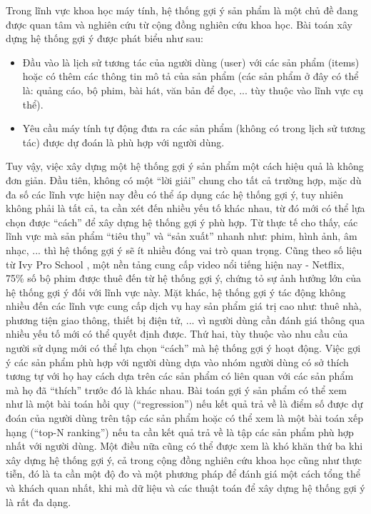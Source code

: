 Trong lĩnh vực khoa học máy tính, hệ thống gợi ý sản phẩm là một chủ đề 
đang được quan tâm và nghiên cứu từ cộng đồng nghiên cứu khoa học.
Bài toán xây dựng hệ thống gợi ý được phát biểu như sau:
\begin{itemize}
    \item Đầu vào là lịch sử tương tác của người dùng (user) với các sản phẩm (items) hoặc có thêm các thông tin mô tả của sản phẩm 
    (các sản phẩm ở đây có thể là: quảng cáo, bộ phim, bài hát, văn bản để đọc, ... tùy thuộc vào lĩnh vực cụ thể).
    \item Yêu cầu máy tính tự động đưa ra các sản phẩm (không có trong lịch sử tương tác) được dự đoán là phù hợp với người dùng.
\end{itemize}

Tuy vậy, việc xây dựng một hệ thống gợi ý sản phẩm một cách hiệu quả là không đơn giản.
Đầu tiên, không có một ``lời giải'' chung cho tất cả trường hợp,
mặc dù đa số các lĩnh vực hiện nay đều có thể áp dụng các hệ thống gợi ý, tuy nhiên không phải là tất cả,
ta cần xét đến nhiều yếu tố khác nhau, 
từ đó mới có thể lựa chọn được ``cách'' để xây dựng hệ thống gợi ý phù hợp. %
Từ thực tế cho thấy, các lĩnh vực mà sản phẩm ``tiêu thụ'' và ``sản xuất'' nhanh như: phim, hình ảnh, âm nhạc, ... 
thì hệ thống gợi ý sẽ ít nhiều đóng vai trò quan trọng. 
Cũng theo số liệu từ Ivy Pro School \cite{ivy}, một nền tảng cung cấp video nổi tiếng hiện nay - Netflix,
75\% số bộ phim được thuê đến từ hệ thống gợi ý, chứng tỏ sự ảnh hưởng lớn của hệ thống gợi ý đối với lĩnh vực này. 
Mặt khác, hệ thống gợi ý tác động không nhiều đến các lĩnh vực cung cấp dịch vụ hay sản phẩm giá trị cao như:
thuê nhà, phương tiện giao thông, thiết bị điện tử, ... vì người dùng cần đánh giá thông qua nhiều yếu tố mới có thể quyết định được. 
Thứ hai, tùy thuộc vào nhu cầu của người sử dụng mới có thể lựa chọn ``cách'' mà hệ thống gợi ý hoạt động.
Việc gợi ý các sản phẩm phù hợp với người dùng dựa vào nhóm người dùng có sở thích tương tự với họ 
hay cách dựa trên các sản phẩm có liên quan với các sản phẩm mà họ đã ``thích'' trước đó là khác nhau.
Bài toán gợi ý sản phẩm có thể xem như là một bài toán hồi quy (``regression'') 
nếu kết quả trả về là điểm số được dự đoán của người dùng trên tập các sản phẩm 
hoặc có thể xem là một bài toán xếp hạng (``top-N ranking'') nếu ta cần kết quả trả về 
là tập các sản phẩm phù hợp nhất với người dùng.
Một điều nữa cũng có thể được xem là khó khăn thứ ba khi xây dựng hệ thống gợi ý, cả trong cộng đồng nghiên cứu khoa học cũng như thực tiễn, 
đó là ta cần một độ đo và một phương pháp để đánh giá một cách tổng thể và khách quan nhất, 
khi mà dữ liệu và các thuật toán để xây dựng hệ thống gợi ý là rất đa dạng.


